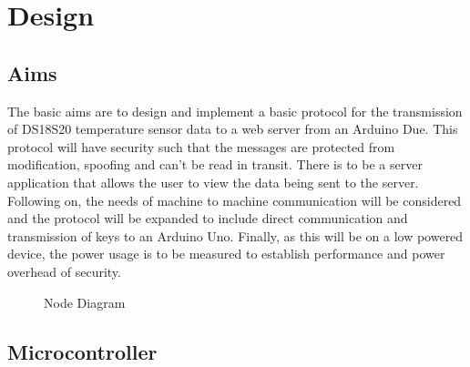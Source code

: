 
\chapter{Design}
\label{design}

\section{Aims}

The basic aims are to design and implement a basic protocol for the transmission of DS18S20 temperature sensor data to a web server from an Arduino Due. This protocol will have security such that the messages are protected from modification, spoofing and can't be read in transit. There is to be a server application that allows the user to view the data being sent to the server.
Following on, the needs of machine to machine communication will be considered and the protocol will be expanded to include direct communication and transmission of keys to an Arduino Uno. Finally, as this will be on a low powered device, the power usage is to be measured to establish performance and power overhead of security. 


\begin{figure}[H]
\centering
{}
\caption{Node Diagram}
\label{dia:node}
\end{figure}


\section{Microcontroller}

